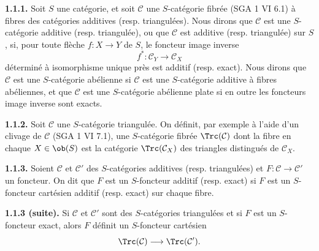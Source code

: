 \documentclass[11pt]{article}
\providecommand{\cC}{\mathcal C}
\providecommand{\Coker}{\operatorname{Coker}}
\providecommand{\Ker}{\operatorname{Ker}}
\providecommand{\cO}{\mathcal O}
\begin{document}
\textbf{1.1.1.} Soit \(S\) une catégorie, et soit \(\mathcal C\) une \(S\)-catégorie fibrée (SGA 1 VI 6.1) à fibres des catégories additives (resp. triangulées). Nous dirons que \(\mathcal C\) est une \(S\)-catégorie additive (resp. triangulée), ou que \(\mathcal C\) est additive (resp. triangulée) sur \(S\), si, pour toute flèche \(f:X\to Y\) de \(S\), le foncteur image inverse
\[
  f^*:\mathcal C_Y\longrightarrow \mathcal C_X
\]
déterminé à isomorphisme unique près est additif (resp. exact). Nous dirons que \(\mathcal C\) est une \(S\)-catégorie abélienne si \(\mathcal C\) est une \(S\)-catégorie additive à fibres abéliennes, et que \(\mathcal C\) est une \(S\)-catégorie abélienne plate si en outre les foncteurs image inverse sont exacts.

\textbf{1.1.2.} Soit \(\mathcal C\) une \(S\)-catégorie triangulée. On définit, par exemple à l'aide d'un clivage de \(\mathcal C\) (SGA 1 VI 7.1), une \(S\)-catégorie fibrée \(\Trc(\mathcal C)\) dont la fibre en chaque \(X\in \ob(S)\) est la catégorie \(\Trc(\mathcal C_X)\) des triangles distingués de \(\mathcal C_X\).

\textbf{1.1.3.} Soient \(\mathcal C\) et \(\mathcal C'\) des \(S\)-catégories additives (resp. triangulées) et \(F:\mathcal C\to\mathcal C'\) un foncteur. On dit que \(F\) est un \(S\)-foncteur additif (resp. exact) si \(F\) est un \(S\)-foncteur cartésien additif (resp. exact) sur chaque fibre.



\providecommand{\cC}{\mathcal C}
\providecommand{\cD}{\mathcal D}
\providecommand{\cK}{\mathcal K}
\providecommand{\cO}{\mathcal O}
\providecommand{\cS}{\mathcal S}
\providecommand{\Cpx}{\mathrm C}
\providecommand{\Kpx}{\mathrm K}
\providecommand{\Dpx}{\mathrm D}
\providecommand{\D}{\mathrm D}
\providecommand{\Ho}{\mathrm H}
\providecommand{\RHom}{\mathrm R\!\operatorname{Hom}}
\providecommand{\Ob}{\operatorname{ob}}
\providecommand{\Coker}{\operatorname{Coker}}
\providecommand{\Ker}{\operatorname{Ker}}
\providecommand{\Im}{\operatorname{Im}}
\providecommand{\Hom}{\operatorname{Hom}}
\providecommand{\Cone}{\operatorname{Cone}}
\providecommand{\id}{\operatorname{Id}}
\providecommand{\qis}{\xrightarrow{\sim}}


\textbf{1.1.3 (suite).} Si \(\mathcal C\) et \(\mathcal C'\) sont des \(S\)-catégories triangulées et si \(F\) est un \(S\)-foncteur exact, alors \(F\) définit un \(S\)-foncteur cartésien
\[
  \Trc(\mathcal C)\longrightarrow \Trc(\mathcal C').
\]
\end{document}
